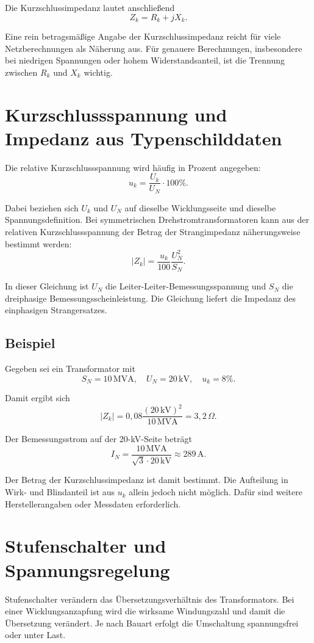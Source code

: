 Die Kurzschlussimpedanz lautet anschließend
\[
  Z_k=R_k+jX_k.
\]

Eine rein betragsmäßige Angabe der Kurzschlussimpedanz reicht für viele
Netzberechnungen als Näherung aus. Für genauere Berechnungen, insbesondere
bei niedrigen Spannungen oder hohem Widerstandsanteil, ist die Trennung
zwischen \(R_k\) und \(X_k\) wichtig.

\section{Kurzschlussspannung und Impedanz aus Typenschilddaten}

Die relative Kurzschlussspannung wird häufig in Prozent angegeben:
\[
  u_k=\frac{U_k}{U_N}\cdot100\%.
\]

Dabei beziehen sich \(U_k\) und \(U_N\) auf dieselbe Wicklungsseite und
dieselbe Spannungsdefinition. Bei symmetrischen Drehstromtransformatoren
kann aus der relativen Kurzschlussspannung der Betrag der Strangimpedanz
näherungsweise bestimmt werden:
\[
  |Z_k|=\frac{u_k}{100}\frac{U_N^2}{S_N}.
\]

In dieser Gleichung ist \(U_N\) die Leiter-Leiter-Bemessungsspannung
und \(S_N\) die dreiphasige Bemessungsscheinleistung. Die Gleichung liefert
die Impedanz des einphasigen Strangersatzes.

\subsection{Beispiel}

Gegeben sei ein Transformator mit
\[
  S_N=10\,\mathrm{MVA},\quad
  U_N=20\,\mathrm{kV},\quad
  u_k=8\%.
\]

Damit ergibt sich
\[
  |Z_k|
  =0{,}08\frac{(20\,\mathrm{kV})^2}{10\,\mathrm{MVA}}
  =3{,}2\,\Omega.
\]

Der Bemessungsstrom auf der 20-kV-Seite beträgt
\[
  I_N=\frac{10\,\mathrm{MVA}}{\sqrt{3}\cdot20\,\mathrm{kV}}
  \approx289\,\mathrm{A}.
\]

Der Betrag der Kurzschlussimpedanz ist damit bestimmt. Die Aufteilung
in Wirk- und Blindanteil ist aus \(u_k\) allein jedoch nicht möglich.
Dafür sind weitere Herstellerangaben oder Messdaten erforderlich.

\section{Stufenschalter und Spannungsregelung}

Stufenschalter verändern das Übersetzungsverhältnis des Transformators.
Bei einer Wicklungsanzapfung wird die wirksame Windungszahl und damit
die Übersetzung verändert. Je nach Bauart erfolgt die Umschaltung
spannungsfrei oder unter Last.


